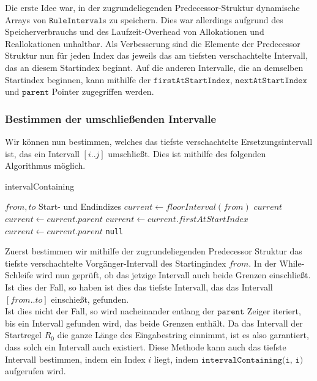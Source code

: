Die erste Idee war, in der zugrundeliegenden Predecessor-Struktur dynamische Arrays von $\texttt{RuleInterval}$s zu speichern. Dies war allerdings aufgrund des Speicherverbrauchs und des Laufzeit-Overhead von Allokationen und Reallokationen unhaltbar. Als Verbesserung sind die Elemente der Predecessor Struktur nun für jeden Index das jeweils das am tiefsten verschachtelte Intervall, das an diesem Startindex beginnt. Auf die anderen Intervalle, die an demselben Startindex beginnen, kann mithilfe der $\texttt{firstAtStartIndex}$, $\texttt{nextAtStartIndex}$ und $\texttt{parent}$ Pointer zugegriffen werden.

\subsubsection{Bestimmen der umschließenden Intervalle}
Wir können nun bestimmen, welches das tiefste verschachtelte Ersetzungsintervall ist, das ein Intervall $[i..j]$ umschließt.
Dies ist mithilfe des folgenden Algorithmus möglich.

\begin{algorithm}
	\caption{intervalContaining}
	\begin{algorithmic}
		\REQUIRE $from, to$ Start- und Endindizes
		\STATE $current \leftarrow floorInterval(from)$
				\RETURN $current$
			\ENDIF
                \STATE $current \leftarrow current.parent$
            \ELSE 
                \STATE $current \leftarrow current.firstAtStartIndex$
                    \STATE $current \leftarrow current.parent$
                \ENDIF
            \ENDIF
		\ENDWHILE
		\RETURN \texttt{null}
	\end{algorithmic}
\end{algorithm}

Zuerst bestimmen wir mithilfe der zugrundeliegenden Predecessor Struktur das tiefste verschachtelte Vorgänger-Intervall des Startingindex $from$. 
In der While-Schleife wird nun geprüft, ob das jetzige Intervall auch beide Grenzen einschließt. Ist dies der Fall, so haben ist dies das tiefste Intervall, das das Intervall $[from..to]$ einschießt, gefunden.\\
Ist dies nicht der Fall, so wird nacheinander entlang der $\texttt{parent}$ Zeiger iteriert, bis ein Intervall gefunden wird, das beide Grenzen enthält. Da das Intervall der Startregel $R_0$ die ganze Länge des Eingabestring einnimmt, ist es also garantiert, dass solch ein Intervall auch existiert. Diese Methode kann auch das tiefste Intervall bestimmen, indem ein Index $i$ liegt, indem $\texttt{intervalContaining(i, i)}$ aufgerufen wird.

